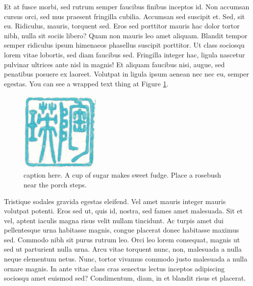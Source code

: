 \documentclass[
  9pt,
  letterpaper,
  DIV=11,
  numbers=noendperiod]{scrartcl}
\begin{document}
Et at fusce morbi, sed rutrum semper faucibus finibus inceptos id. Non
accumsan cursus orci, sed mus praesent fringilla cubilia. Accumsan sed
suscipit et. Sed, sit eu. Ridiculus, mauris, torquent sed. Eros sed
porttitor mauris hac dolor tortor nibh, nulla sit sociis libero? Quam
non mauris leo amet aliquam. Blandit tempor semper ridiculus ipsum
himenaeos phasellus suscipit porttitor. Ut class sociosqu lorem vitae
lobortis, sed diam faucibus sed. Fringilla integer hac, ligula nascetur
pulvinar ultrices ante nisl in magnis! Et aliquam faucibus nisi, augue,
sed penatibus posuere ex laoreet. Volutpat in ligula ipsum aenean nec
nec eu, semper egestas. You can see a wrapped text thing at Figure
\ref{fig-wrap}.


\begin{figure}
  \centering
  \includegraphics[width=0.35\textwidth]{stamp1b.jpg}
  \caption{\label{fig-wrap}caption here. A cup of sugar makes sweet fudge. Place a rosebush near the porch steps.}
  \vspace{-3pt}
\end{figure}

Tristique sodales gravida egestas eleifend. Vel amet mauris integer
mauris volutpat potenti. Eros sed ut, quis id, nostra, sed fames amet
malesuada. Sit et vel, aptent iaculis magna risus velit nullam
tincidunt. Ac turpis amet dui pellentesque urna habitasse magnis, congue
placerat donec habitasse maximus sed. Commodo nibh sit purus rutrum leo.
Orci leo lorem consequat, magnis ut sed ut parturient nulla urna. Arcu
vitae torquent nunc, non, malesuada a nulla neque elementum netus. Nunc,
tortor vivamus commodo justo malesuada a nulla ornare magnis. In ante
vitae class cras senectus lectus inceptos adipiscing sociosqu amet
euismod sed? Condimentum, diam, in et blandit risus et placerat.
\end{document}
